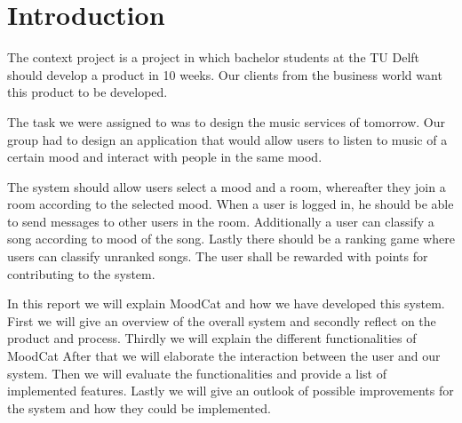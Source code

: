 \chapter{Introduction}

The context project is a project in which bachelor students at the TU Delft should develop a product in 10 weeks.
Our clients from the business world want this product to be developed.

The task we were assigned to was to design the music services of tomorrow.
Our group had to design an application that would allow users to listen to music of a certain mood and interact with people in the same mood.


The system should allow users select a mood and a room, whereafter they join a room according to the selected mood.
When a user is logged in, he should be able to send messages to other users in the room.
Additionally a user can classify a song according to mood of the song.
Lastly there should be a ranking game where users can classify unranked songs.
The user shall be rewarded with points for contributing to the system.


In this report we will explain MoodCat and how we have developed this system.
First we will give an overview of the overall system and secondly reflect on the product and process.
Thirdly we will explain the different functionalities of MoodCat After that we will elaborate the interaction between the user and our system.
Then we will evaluate the functionalities and provide a list of implemented features.
Lastly we will give an outlook of possible improvements for the system and how they could be implemented.